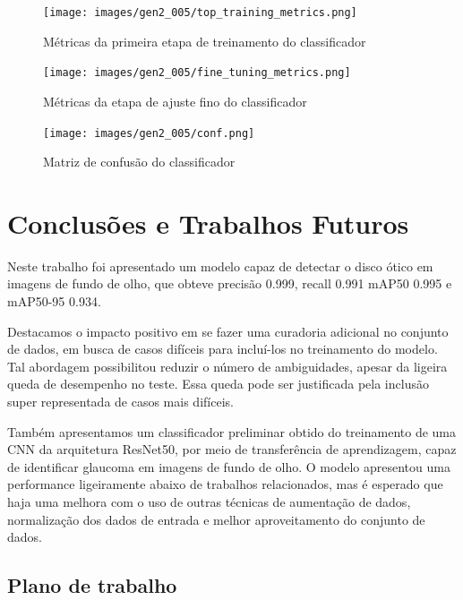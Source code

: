 \documentclass[12pt]{article}
\begin{document}
\begin{figure}[ht]
 \centering
 \texttt{[image: images/gen2\_005/top\_training\_metrics.png]}
 \caption{Métricas da primeira etapa de treinamento do classificador}
 \label{fig:gen2_005_tt_metrics}
\end{figure}

\begin{figure}[h!t]
 \centering
 \texttt{[image: images/gen2\_005/fine\_tuning\_metrics.png]}
 \caption{Métricas da etapa de ajuste fino do classificador}
 \label{fig:gen2_005_ft_metrics}
\end{figure}

\begin{figure}[htb]
 \centering
 \texttt{[image: images/gen2\_005/conf.png]}
 \caption{Matriz de confusão do classificador}
 \label{fig:gen2_005_confusion_matrix}
\end{figure}

\section{Conclusões e Trabalhos Futuros}
\label{sec:conclusions}

Neste trabalho foi apresentado um modelo capaz de detectar o disco ótico em imagens de fundo de olho, que obteve precisão 0.999, recall 0.991 mAP50 0.995 e mAP50-95 0.934.

Destacamos o impacto positivo em se fazer uma curadoria adicional no conjunto de dados, em busca de casos difíceis para incluí-los no treinamento do modelo. Tal abordagem possibilitou reduzir o número de ambiguidades, apesar da ligeira queda de desempenho no teste. Essa queda pode ser justificada pela inclusão super representada de casos mais difíceis.

Também apresentamos um classificador preliminar obtido do treinamento de uma CNN da arquitetura ResNet50, por meio de transferência de aprendizagem, capaz de identificar glaucoma em imagens de fundo de olho. O modelo apresentou uma performance ligeiramente abaixo de trabalhos relacionados, mas é esperado que haja uma melhora com o uso de outras técnicas de aumentação de dados, normalização dos dados de entrada e melhor aproveitamento do conjunto de dados.

\subsection{Plano de trabalho}
\label{sec:schedule}
\end{document}
